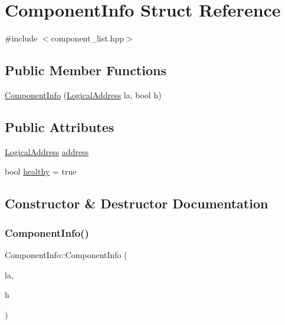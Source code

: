 \hypertarget{structComponentInfo}{}\section{Component\+Info Struct Reference}
\label{structComponentInfo}


{\ttfamily \#include $<$component\+\_\+list.\+hpp$>$}

\subsection*{Public Member Functions}
\begin{DoxyCompactItemize}
\item 
\hyperlink{structComponentInfo_aa02e1576e688c7883e97e242a804cff4}{Component\+Info} (\hyperlink{structLogicalAddress}{Logical\+Address} la, bool h)
\end{DoxyCompactItemize}
\subsection*{Public Attributes}
\begin{DoxyCompactItemize}
\item 
\hyperlink{structLogicalAddress}{Logical\+Address} \hyperlink{structComponentInfo_a0ebb1e5717838ca670048317eeda0bed}{address}
\item 
bool \hyperlink{structComponentInfo_af3eec118fc95855cf27a9825f04a659c}{healthy} = true
\end{DoxyCompactItemize}


\subsection{Constructor \& Destructor Documentation}
\mbox{\label{structComponentInfo_aa02e1576e688c7883e97e242a804cff4}} 
\subsubsection{\texorpdfstring{Component\+Info()}{ComponentInfo()}}
{\footnotesize\ttfamily Component\+Info\+::\+Component\+Info (\begin{DoxyParamCaption}\item[{\hyperlink{structLogicalAddress}{Logical\+Address}}]{la,  }\item[{bool}]{h }\end{DoxyParamCaption})\hspace{0.3cm}{\ttfamily [inline]}}



